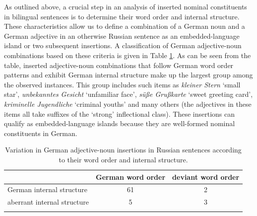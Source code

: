 \begin{sloppypar}
As outlined above, a crucial step in an analysis of inserted nominal constituents in bilingual sentences is to determine their word order and internal structure. These characteristics allow us to define a combination of a German noun and a German adjective in an otherwise Russian sentence as an embedded-language island or two subsequent insertions. A classification of German adjective-noun combinations based on these criteria is given in Table \ref{tab:4:2}. As can be seen from the table, inserted adjective-noun combinations that follow German word order patterns and exhibit German internal structure make up the largest group among the observed instances. This group includes such items as \textit{kleiner Stern} `small star', \textit{unbekanntes Gesicht} `unfamiliar face', \textit{süße Grußkarte} `sweet greeting card', \textit{kriminelle Jugendliche} `criminal youths' and many others (the adjectives in these items all take suffixes of the `strong' inflectional class). These insertions can qualify as embedded-language islands because they are well-formed nominal constituents in German.
\end{sloppypar}

\begin{table}
\begin{tabular}{lcc}
\lsptoprule
	    & German word order	& deviant word order\\ 	\midrule
	German internal structure	& 61	& 2	\\
	aberrant internal structure & 5	& 3\\
	\lspbottomrule		
	\end{tabular}
	\caption{Variation in German adjective-noun insertions in Russian sentences according to their word order and internal structure.\label{tab:4:2}}
\end{table}


